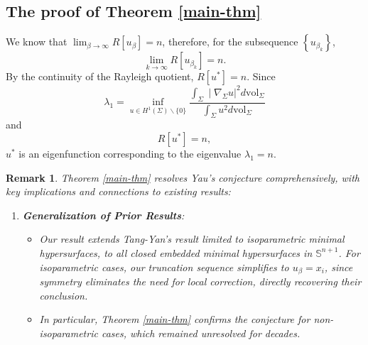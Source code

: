 \documentclass[a4, 12pt]{amsart}
\numberwithin{equation}{section} \numberwithin{equation}{section}
\newtheorem{rem}{Remark}[section]{\bfseries\upshape}
\begin{document}
\subsection{The proof of Theorem {\rm \ref{main-thm}}}
We know that $\lim _{\beta \rightarrow \infty} R\left[u_{\beta}\right]=n$, therefore, for the subsequence $\left\{u_{\beta_{k}}\right\}$,
\begin{equation*}\lim _{k \rightarrow \infty} R\left[u_{\beta_{k}}\right]=n.\end{equation*} By the continuity of the Rayleigh quotient, $R\left[u^*\right]=n$.
Since
\begin{equation*}\lambda_{1}=\inf _{u \in H^{1}(\Sigma) \backslash\{0\}} \frac{\int_{\Sigma} \mid \nabla_{\Sigma} u|^{2}   d \mathrm{vol}_{\Sigma}}{\int_{\Sigma} u^{2} d \mathrm{vol}_{\Sigma}}\end{equation*} and
\begin{equation*}R\left[u^*\right]=n,\end{equation*} $u^*$ is an eigenfunction corresponding to the eigenvalue $\lambda_{1}=n$.


\begin{rem}
Theorem \ref{main-thm} resolves Yau's conjecture comprehensively, with key implications and connections to existing results:

\begin{enumerate}
    \item \textbf{Generalization of Prior Results}:
    \begin{itemize}
        \item[(i)] Our result extends Tang-Yan's result \cite{TY1} limited to isoparametric minimal hypersurfaces, to all closed embedded minimal hypersurfaces in $\mathbb{S}^{n+1}$. For isoparametric cases, our truncation sequence simplifies to $u_\beta = x_i$, since symmetry eliminates the need for local correction, directly recovering their conclusion.
        \item[(ii)]In particular, Theorem {\rm \ref{main-thm}} confirms the conjecture for non-isoparametric cases, which remained unresolved for decades.
    \end{itemize}
\end{enumerate}
\end{rem}
\end{document}
